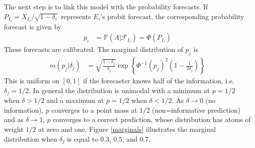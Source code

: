 \documentclass[11pt]{article}
\renewcommand{\P}{\mathbb{P}}
\theoremstyle{definition}
\theoremstyle{definition}
\def\P{{\mathbb P}}
\begin{document}
The next step is to link this model with the probability forecasts. 
If $P_{I_i} = X_{I_i}/\sqrt{1-\delta_i}$ represents $E_i$'s probit 
forecast, the corresponding probability forecast is given by
\begin{align}
p_i &= \P\left(A | \mathcal{F}_{I_i}\right) = \Phi\left( P_{I_i}\right) 
\label{Indiv}
\end{align}
These forecasts are calibrated. 
The marginal distribution of $p_j$ is
\begin{align*}
m(p_j | \delta_j) &= \sqrt{\frac{1-\delta_j}{\delta_j}} \exp 
   \left\{ \Phi^{-1}(p_j)^2 \left(1-\frac{1}{2 \delta_j} \right) \right\} 
\end{align*}
This is uniform on $[0,1]$ if the forecaster knows half of the information, 
i.e. $\delta_j = 1/2$.  In general the distribution is unimodal with
a minimum at $p = 1/2$ when $\delta > 1/2$ and a maximum at $p = 1/2$
when $\delta < 1/2$.  As $\delta \to 0$ (no information), $p$ converges
to a point mass at $1/2$ (non=informative prediction) and as $\delta \to 1$,
$p$ converges to a correct prediction, whose distribution has atoms of
weight $1/2$ at zero and one. Figure \ref{marginals} illustrates the marginal distribution when $\delta_j$ is equal to $0.3$, $0.5$, and $0.7$. 
\end{document}
